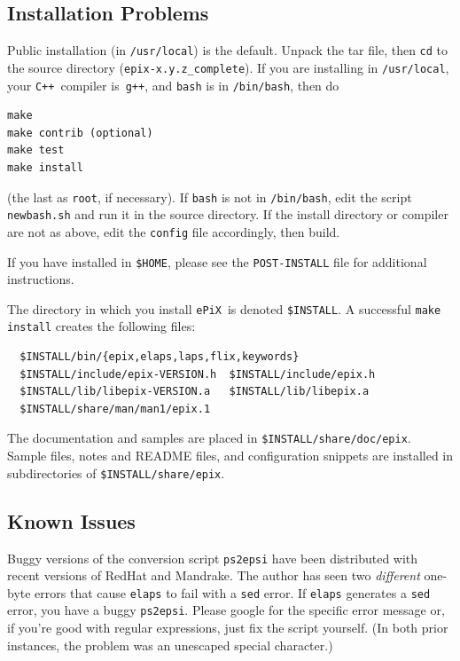 \documentclass[12pt]{report}
\newcommand{\code}[1]{\texttt{#1}}
\newcommand{\filename}[1]{\texttt{#1}}
\newcommand{\ePiX}{\code{ePiX}}
\newcommand{\CXX}{\code{C++}}
\begin{document}
\subsection*{Installation Problems}

Public installation (in \code{/usr/local}) is the default. Unpack
the tar file, then \code{cd} to the source directory
(\filename{epix-x.y.z\_complete}). If you are installing in
\filename{/usr/local}, your \CXX~compiler is~\code{g++}, and
\code{bash} is in \filename{/bin/bash}, then do
\begin{verbatim}
make
make contrib (optional)
make test
make install
\end{verbatim}
(the last as \code{root}, if necessary). If \code{bash} is not in
\filename{/bin/bash}, edit the script \filename{newbash.sh} and run it
in the source directory.  If the install directory or compiler are not
as above, edit the \code{config} file accordingly, then build.

If you have installed in \filename{\$HOME}, please see the
\filename{POST-INSTALL} file for additional instructions. 

The directory in which you install \ePiX\ is denoted
\filename{\$INSTALL}. A successful \code{make install} creates the
following files:
\begin{verbatim}
  $INSTALL/bin/{epix,elaps,laps,flix,keywords}
  $INSTALL/include/epix-VERSION.h  $INSTALL/include/epix.h
  $INSTALL/lib/libepix-VERSION.a   $INSTALL/lib/libepix.a
  $INSTALL/share/man/man1/epix.1
\end{verbatim}
The documentation and samples are placed in
\filename{\$INSTALL/share/doc/epix}.  Sample files, notes and README
files, and configuration snippets are installed in subdirectories of
\filename{\$INSTALL/share/epix}.


\subsection*{Known Issues}

Buggy versions of the conversion script \code{ps2epsi} have been
distributed with recent versions of RedHat and Mandrake. The author
has seen two \emph{different} one-byte errors that cause \code{elaps}
to fail with a \code{sed} error. If \code{elaps} generates a
\code{sed} error, you have a buggy \code{ps2epsi}.  Please google for
the specific error message or, if you're good with regular
expressions, just fix the script yourself. (In both prior instances,
the problem was an unescaped special character.)
\end{document}
